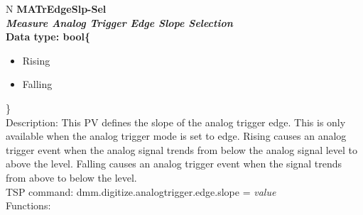 \documentclass[openany]{article}
\begin{document}
		\begin{tabular}{N}
			\hline
			\bfseries MATrEdgeSlp-Sel\label{pv:matredgeslp-sel} \\ \hline
			\emph{Measure Analog Trigger Edge Slope Selection} \\
			Data type: bool\{\begin{itemize}[noitemsep]
				\small
				\item[] Rising
				\item[] Falling
			\end{itemize}\} \\
			Description: This PV defines the slope of the analog trigger edge. This is only available when the analog trigger mode is set to edge. Rising causes an analog trigger event when the analog signal trends from below the analog signal
level to above the level. Falling causes an analog trigger event when the signal trends from above to below the level. \\
			TSP command: dmm.digitize.analogtrigger.edge.slope = \emph{value} \\
			Functions: \\
			\arrayrulecolor{\FuncTableBorderColor}

		\end{tabular}
\end{document}
